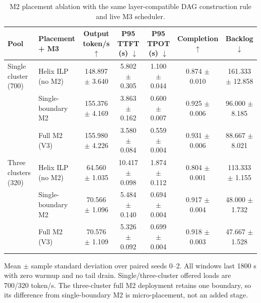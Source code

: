 \documentclass[twocolumn]{article}
\begin{document}
\begin{table}[t]
\caption{M2 placement ablation with the same layer-compatible DAG construction rule and live M3 scheduler.}
\label{tab:v3-m2-ablation}
\centering
\scriptsize
\setlength{\tabcolsep}{3pt}
\begin{tabular}{@{}llccccc@{}}
\toprule
Pool & Placement + M3 & Output token/s $\uparrow$ & P95 TTFT (s) $\downarrow$ & P95 TPOT (s) $\downarrow$ & Completion $\uparrow$ & Backlog $\downarrow$ \\
\midrule
Single cluster (700) & Helix ILP (no M2) & 148.897 $\pm$ 3.640 & 5.802 $\pm$ 0.305 & 1.100 $\pm$ 0.044 & 0.874 $\pm$ 0.010 & 161.333 $\pm$ 12.858 \\
 & Single-boundary M2 & 155.376 $\pm$ 4.169 & 3.863 $\pm$ 0.162 & 0.600 $\pm$ 0.007 & 0.925 $\pm$ 0.006 & 96.000 $\pm$ 8.185 \\
 & Full M2 (V3) & 155.980 $\pm$ 4.226 & 3.580 $\pm$ 0.084 & 0.559 $\pm$ 0.004 & 0.931 $\pm$ 0.006 & 88.667 $\pm$ 8.021 \\
\midrule
Three clusters (320) & Helix ILP (no M2) & 64.560 $\pm$ 1.035 & 10.417 $\pm$ 0.098 & 1.874 $\pm$ 0.112 & 0.804 $\pm$ 0.001 & 113.333 $\pm$ 1.155 \\
 & Single-boundary M2 & 70.566 $\pm$ 1.096 & 5.484 $\pm$ 0.140 & 0.694 $\pm$ 0.004 & 0.917 $\pm$ 0.004 & 48.000 $\pm$ 1.732 \\
 & Full M2 (V3) & 70.576 $\pm$ 1.109 & 5.326 $\pm$ 0.092 & 0.699 $\pm$ 0.004 & 0.918 $\pm$ 0.003 & 47.667 $\pm$ 1.528 \\
\bottomrule
\end{tabular}
\vspace{2pt}
\parbox{\textwidth}{\scriptsize Mean $\pm$ sample standard deviation over paired seeds 0--2. All windows last 1800 s with zero warmup and no tail drain. Single/three-cluster offered loads are 700/320 token/s. The three-cluster full M2 deployment retains one boundary, so its difference from single-boundary M2 is micro-placement, not an added stage.}
\end{table}
\end{document}

